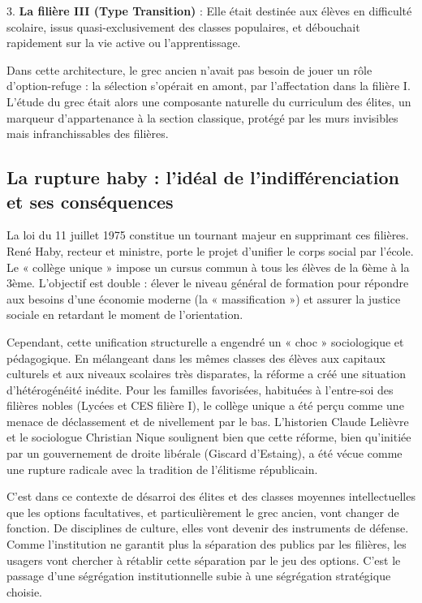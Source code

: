 3. \textbf{La filière III (Type Transition)} : Elle était destinée aux élèves en difficulté
scolaire, issus quasi-exclusivement des classes populaires, et débouchait rapidement sur la vie
active ou l'apprentissage.\cite{I-3-1-ref3}

Dans cette architecture, le grec ancien n'avait pas besoin de jouer un rôle d'option-refuge : la
sélection s'opérait en amont, par l'affectation dans la filière I. L'étude du grec était alors une
composante \og naturelle\fg{} du curriculum des élites, un marqueur d'appartenance à la section
classique, protégé par les murs invisibles mais infranchissables des filières.



\subsection{La rupture haby : l'idéal de l'indifférenciation et ses conséquences}

La loi du 11 juillet 1975 constitue un tournant majeur en supprimant ces filières. René Haby,
recteur et ministre, porte le projet d'unifier le corps social par l'école. Le « collège unique »
impose un cursus commun à tous les élèves de la 6ème à la 3ème. L'objectif est double : élever le
niveau général de formation pour répondre aux besoins d'une économie moderne (la « massification »)
et assurer la justice sociale en retardant le moment de l'orientation.\cite{I-3-1-ref1}

Cependant, cette unification structurelle a engendré un « choc » sociologique et pédagogique. En
mélangeant dans les mêmes classes des élèves aux capitaux culturels et aux niveaux scolaires très
disparates, la réforme a créé une situation d'hétérogénéité inédite. Pour les familles favorisées,
habituées à l'entre-soi des filières nobles (Lycées et CES filière I), le collège unique a été perçu
comme une menace de déclassement et de nivellement par le bas.\cite{I-3-1-ref3} L'historien Claude
Lelièvre et le sociologue Christian Nique soulignent bien que cette réforme, bien qu'initiée par un
gouvernement de droite libérale (Giscard d'Estaing), a été vécue comme une rupture radicale avec la
tradition de l'élitisme républicain.\cite{I-3-1-ref6}

C'est dans ce contexte de désarroi des élites et des classes moyennes intellectuelles que les
options facultatives, et particulièrement le grec ancien, vont changer de fonction. De disciplines
de culture, elles vont devenir des instruments de défense. Comme l'institution ne garantit plus la
séparation des publics par les filières, les usagers vont chercher à rétablir cette séparation par
le jeu des options. C'est le passage d'une ségrégation institutionnelle subie à une ségrégation
stratégique choisie.



